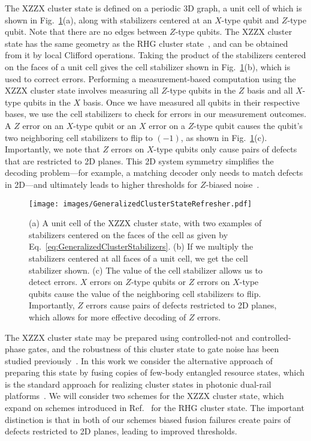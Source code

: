 \documentclass[reprint,
groupedaddress,
 prl,amsmath,amssymb,
 aps]{revtex4-2}
\theoremstyle{definition}
\begin{document}
\begin{bibunit}
The XZZX cluster state is defined on a periodic 3D graph, a unit cell of which is shown in Fig.~\ref{fig:XZZXClusterStateRefresher}(a), along with stabilizers centered at an $X$-type qubit and $Z$-type qubit. Note that there are no edges between $Z$-type qubits. The XZZX cluster state has the same geometry as the RHG cluster state~\cite{raussendorf2005long,raussendorf2006fault}, and can be obtained from it by local Clifford operations. Taking the product of the stabilizers centered on the faces of a unit cell gives the cell stabilizer shown in Fig.~\ref{fig:XZZXClusterStateRefresher}(b), which is used to correct errors. Performing a measurement-based computation using the XZZX cluster state involves measuring all $Z$-type qubits in the $Z$ basis and all $X$-type qubits in the $X$ basis. Once we have measured all qubits in their respective bases, we use the cell stabilizers to check for errors in our measurement outcomes. A $Z$ error on an $X$-type qubit or an $X$ error on a $Z$-type qubit causes {the qubit's two} neighboring cell stabilizers to flip to $(-1)$, as shown in Fig.~\ref{fig:XZZXClusterStateRefresher}(c). Importantly, we note that $Z$ errors on $X$-type qubits only cause pairs of defects that are restricted to 2D planes. This 2D system symmetry simplifies the decoding problem{---for example,} a matching decoder only needs to match defects in 2D---and ultimately leads to higher thresholds for $Z$-biased noise~\cite{claes2022tailored,brown2022conservation}.


\begin{figure}
    \centering
    \texttt{[image: images/GeneralizedClusterStateRefresher.pdf]}
    \caption{(a) A unit cell of the XZZX cluster state, with two examples of stabilizers centered on the faces of the cell as given by Eq.~\eqref{eq:GeneralizedClusterStabilizers}. (b) If we multiply the stabilizers centered at all faces of a unit cell, we get the cell stabilizer shown. (c) The value of the cell stabilizer allows us to detect errors. $X$ errors on $Z$-type qubits or $Z$ errors on $X$-type qubits cause the value of the neighboring cell stabilizers to flip. Importantly, $Z$ errors cause pairs of defects restricted to 2D planes, which allows for more effective decoding of $Z$ errors.}
    \label{fig:XZZXClusterStateRefresher}
\end{figure}



The XZZX cluster state may be prepared using controlled-not and controlled-phase gates, and the robustness of this cluster state to gate noise has been studied previously~\cite{claes2022tailored}. In this work we consider the alternative approach of preparing this state by fusing copies of few-body entangled resource states, which is the standard approach for realizing cluster states in photonic dual-rail platforms~\cite{nielsen2004optical,browne2005resource,herrera2010photonic,bartolucci2021fusion}.  We will consider two schemes for the 
XZZX cluster state, which expand on schemes introduced in Ref.~\cite{bartolucci2021fusion} for the RHG cluster state. The important distinction is that in both of our schemes biased fusion failures {create pairs of defects restricted to 2D planes}, leading to improved thresholds.


\end{bibunit}
\end{document}
